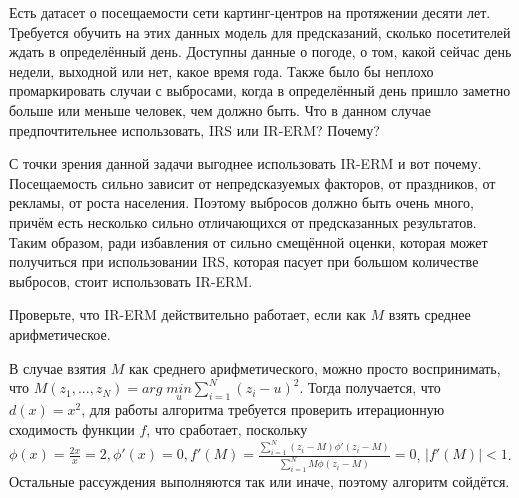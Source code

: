 \problem

Есть датасет о посещаемости сети картинг-центров на протяжении десяти лет. Требуется обучить на этих данных модель для предсказаний, сколько посетителей ждать в определённый день. Доступны данные о погоде, о том, какой сейчас день недели, выходной или нет, какое время года. Также было бы неплохо промаркировать случаи с выбросами, когда в определённый день пришло заметно больше или меньше человек, чем должно быть. Что в данном случае предпочтительнее использовать, IRS или IR-ERM? Почему?


\begin{solution}

    С точки зрения данной задачи выгоднее использовать IR-ERM и вот почему. Посещаемость сильно зависит от непредсказуемых факторов, от праздников, от рекламы, от роста населения. Поэтому выбросов должно быть очень много, причём есть несколько сильно отличающихся от предсказанных результатов. Таким образом, ради избавления от сильно смещённой оценки, которая может получиться при использовании IRS, которая пасует при большом количестве выбросов, стоит использовать IR-ERM.

\end{solution}


\problem

Проверьте, что IR-ERM действительно работает, если как $M$ взять среднее арифметическое.

\begin{solution}
    В случае взятия $M$ как среднего арифметического, можно просто воспринимать, что $M(z_1,...,z_N) = arg \; \underset{u}{min} \sum_{i=1}^N (z_i - u)^2$. Тогда получается, что $d(x) = x^2$, для работы алгоритма требуется проверить итерационную сходимость функции $f$, что сработает, поскольку $\phi (x) = \frac{2x}{x} = 2, \phi'(x) = 0, f'(M) = \frac{\sum_{i=1}^N (z_i - M) \phi'(z_i - M)}{\sum_{i=1}^N M \phi(z_i - M)} = 0$,
    $|f'(M)| < 1$. Остальные рассуждения выполняются так или иначе, поэтому алгоритм сойдётся.
\end{solution}
